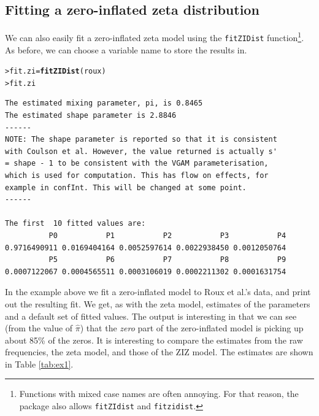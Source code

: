 \documentclass{article}\usepackage[]{graphicx}\usepackage[]{xcolor}
\makeatletter
\newcommand{\hldef}[1]{\textcolor[rgb]{0.345,0.345,0.345}{#1}}%
\newcommand{\hlkwb}[1]{\textcolor[rgb]{0.69,0.353,0.396}{#1}}%
\newcommand{\hlkwd}[1]{\textcolor[rgb]{0.737,0.353,0.396}{\textbf{#1}}}%
\newenvironment{kframe}{%
 \def\at@end@of@kframe{}%
 \ifinner\ifhmode%
  \def\at@end@of@kframe{\end{minipage}}%
  \begin{minipage}{\columnwidth}%
 \fi\fi%
 \def\FrameCommand##1{\hskip\@totalleftmargin \hskip-\fboxsep
 \colorbox{shadecolor}{##1}\hskip-\fboxsep
     \hskip-\linewidth \hskip-\@totalleftmargin \hskip\columnwidth}%
 \MakeFramed {\advance\hsize-\width
   \@totalleftmargin\z@ \linewidth\hsize
   \@setminipage}}%
 {\par\unskip\endMakeFramed%
 \at@end@of@kframe}
\newenvironment{knitrout}{}{} %
\newcommand{\rcode}[1]{\lstinline[language=R,basicstyle=\normalsize\ttfamily]!#1!}
\makeatother
\begin{document}
\subsection{Fitting a zero-inflated zeta distribution}
We can also easily fit a zero-inflated zeta model using the \rcode{fitZIDist} function\footnote{Functions with mixed case names are often annoying. For that reason, the package also allows \rcode{fitZIdist} and \rcode{fitzidist}.}. As before, we can choose a variable name to store the results in.
\begin{knitrout}
\color{fgcolor}\begin{kframe}
\begin{alltt}
\hldef{> }\hldef{fit.zi} \hlkwb{=} \hlkwd{fitZIDist}\hldef{(roux)}
\hldef{> }\hldef{fit.zi}
\end{alltt}
\begin{verbatim}
The estimated mixing parameter, pi, is 0.8465 
The estimated shape parameter is 2.8846 
------
NOTE: The shape parameter is reported so that it is consistent
with Coulson et al. However, the value returned is actually s'
= shape - 1 to be consistent with the VGAM parameterisation,
which is used for computation. This has flow on effects, for
example in confInt. This will be changed at some point.
------

The first  10 fitted values are:
          P0           P1           P2           P3           P4 
0.9716490911 0.0169404164 0.0052597614 0.0022938450 0.0012050764 
          P5           P6           P7           P8           P9 
0.0007122067 0.0004565511 0.0003106019 0.0002211302 0.0001631754 
\end{verbatim}
\end{kframe}
\end{knitrout}\noindent
In the example above we fit a zero-inflated model to Roux et al.'s data, and print out the resulting fit. We get, as with the zeta model, estimates of the parameters and a default set of fitted values. The output is interesting in that we can see (from the value of $\hat{\pi}$) that the \emph{zero} part of the zero-inflated model is picking up about 85\% of the zeros. It is interesting to compare the estimates from the raw frequencies, the zeta model, and those of the ZIZ model. The estimates are shown in Table \ref{tab:ex1}.
\end{document}
